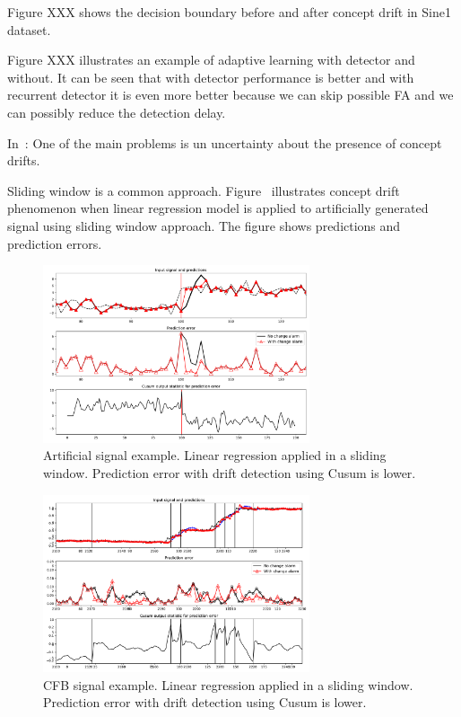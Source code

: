 \documentclass[12 pt]{article}
\begin{document}
  Figure XXX shows the decision boundary before and after concept drift in Sine1 dataset.

  Figure XXX illustrates an example of adaptive learning with detector and without. 
  It can be seen that with detector performance is better and with recurrent detector it is even more better because we can skip possible FA and we can possibly reduce the detection delay.

  In~\cite{SouzaRMB20}: One of the main problems is un uncertainty about the presence of concept drifts.

  Sliding window is a common approach.
  Figure~\cite{fig:art_sig_example} illustrates concept drift phenomenon when linear regression model is applied to artificially generated signal using sliding window approach. 
  The figure shows predictions and prediction errors.
  \begin{figure}[!htb]
    \centering
    \includegraphics[width=0.7\textwidth]{images/proof_of_concept_linreg_art_sig}
    \caption{Artificial signal example. Linear regression applied in a sliding window. Prediction error with drift detection using Cusum is lower.}\label{fig:art_sig_example}
  \end{figure}
  \begin{figure}[!htb]
    \centering
    \includegraphics[width=0.7\textwidth]{images/proof_of_concept_linreg_cfb_sig}
    \caption{CFB signal example. Linear regression applied in a sliding window. Prediction error with drift detection using Cusum is lower.}\label{fig:cfb_sig_linreg_proof_of_concept}
  \end{figure}
\end{document}
